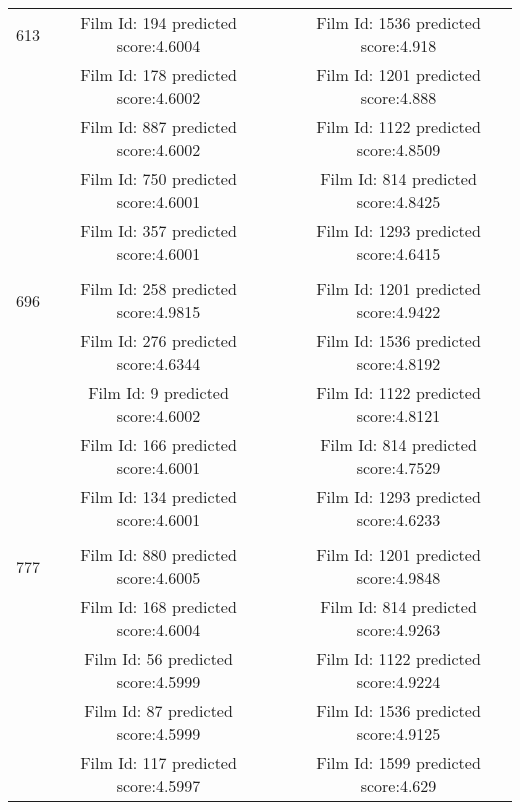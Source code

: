 \begin{longtable}{|c|c|c|c|}
           &            &            &            \\
\hline
\multicolumn{ 1}{|c|}{613} & Film Id: 194 predicted score:4.6004 &            & Film Id: 1536 predicted score:4.918 \\
\hline
\multicolumn{ 1}{|c|}{} & Film Id: 178 predicted score:4.6002 &            & Film Id: 1201 predicted score:4.888 \\
\hline
\multicolumn{ 1}{|c|}{} & Film Id: 887 predicted score:4.6002 &            & Film Id: 1122 predicted score:4.8509 \\
\hline
\multicolumn{ 1}{|c|}{} & Film Id: 750 predicted score:4.6001 &            & Film Id: 814 predicted score:4.8425 \\
\hline
\multicolumn{ 1}{|c|}{} & Film Id: 357 predicted score:4.6001 &            & Film Id: 1293 predicted score:4.6415 \\
\hline
           &            &            &            \\
\hline
\multicolumn{ 1}{|c|}{696} & Film Id: 258 predicted score:4.9815 &            & Film Id: 1201 predicted score:4.9422 \\
\hline
\multicolumn{ 1}{|c|}{} & Film Id: 276 predicted score:4.6344 &            & Film Id: 1536 predicted score:4.8192 \\
\hline
\multicolumn{ 1}{|c|}{} & Film Id: 9 predicted score:4.6002 &            & Film Id: 1122 predicted score:4.8121 \\
\hline
\multicolumn{ 1}{|c|}{} & Film Id: 166 predicted score:4.6001 &            & Film Id: 814 predicted score:4.7529 \\
\hline
\multicolumn{ 1}{|c|}{} & Film Id: 134 predicted score:4.6001 &            & Film Id: 1293 predicted score:4.6233 \\
\hline
           &            &            &            \\
\hline
\multicolumn{ 1}{|c|}{777} & Film Id: 880 predicted score:4.6005 &            & Film Id: 1201 predicted score:4.9848 \\
\hline
\multicolumn{ 1}{|c|}{} & Film Id: 168 predicted score:4.6004 &            & Film Id: 814 predicted score:4.9263 \\
\hline
\multicolumn{ 1}{|c|}{} & Film Id: 56 predicted score:4.5999 &            & Film Id: 1122 predicted score:4.9224 \\
\hline
\multicolumn{ 1}{|c|}{} & Film Id: 87 predicted score:4.5999 &            & Film Id: 1536 predicted score:4.9125 \\
\hline
\multicolumn{ 1}{|c|}{} & Film Id: 117 predicted score:4.5997 &            & Film Id: 1599 predicted score:4.629 \\
\hline
\end{longtable} 

